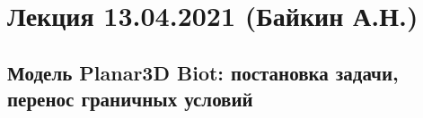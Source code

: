 \documentclass[main.tex]{subfiles}
\begin{document}

\section{Лекция 13.04.2021 (Байкин А.Н.)}

\subsection{Модель Planar3D Biot: постановка задачи, перенос граничных условий}
\end{document}
